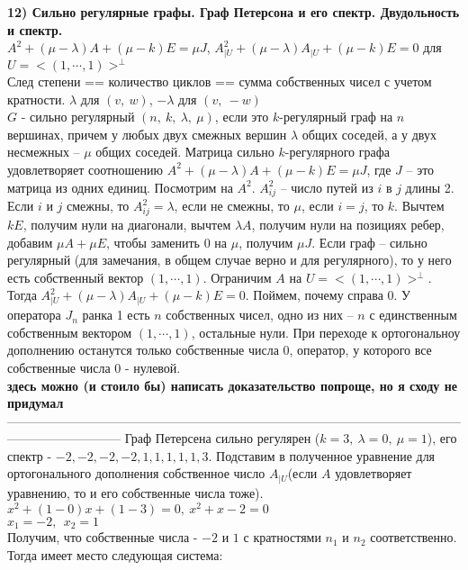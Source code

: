\textbf{12) Сильно регулярные графы. Граф Петерсона и его спектр. Двудольность и спектр.}\\
	
	$A^2+(\mu-\lambda)A + (\mu-k)E=\mu J$, $A_{|U}^2 + (\mu-\lambda)A_{|U} + (\mu-k)E = 0$ для $U = <(1,\cdots,1)>^{\bot}$\\
	След степени == количество циклов == сумма собственных чисел с учетом кратности. $\lambda$ для $(v,\:w)$, $-\lambda$ для $(v,\:-w)$\\
	
	
$G$ - сильно регулярный $(n,~k,~\lambda,~\mu)$, если это $k$-регулярный граф на $n$ вершинах, причем у любых двух смежных вершин $\lambda$ общих соседей, а у двух несмежных -- $\mu$ общих соседей.
\thrm Матрица сильно $k$-регулярного графа удовлетворяет соотношению $A^2+(\mu-\lambda)A + (\mu-k)E=\mu J$, где $J$ -- это матрица из одних единиц.
\ethrm
\proof Посмотрим на $A^2$. $A^2_{ij}$ -- число путей из $i$ в $j$ длины 2. Если $i$ и $j$ смежны, то $A^2_{ij} = \lambda$, если не смежны, то $\mu$, если $i = j$, то $k$. Вычтем $kE$, получим нули на диагонали, вычтем $\lambda A$, получим нули на позициях ребер, добавим $\mu A + \mu E$, чтобы заменить 0 на $\mu$, получим $\mu J$.
\endproof
\rm Если граф -- сильно регулярный (для замечания, в общем случае верно и для регулярного), то у него есть собственный вектор $(1,\cdots,1)$. Ограничим $A$ на $U = <(1,\cdots,1)>^{\bot}$.
Тогда $A_{|U}^2 + (\mu-\lambda)A_{|U} + (\mu-k)E = 0$. Поймем, почему справа 0. У оператора $J_n$ ранка 1 есть $n$ собственных чисел, одно из них -- $n$ с единственным собственным вектором $(1,\cdots,1)$, остальные нули. При переходе к ортогональноу дополнению останутся только собственные числа 0, оператор, у которого все собственные числа 0 - нулевой.\\ 
\textbf{ здесь можно (и стоило бы) написать доказательство попроще, но я сходу не придумал}
\erm
---------------------------------------------------------------------------------------------------------------------------------------
\crl Граф Петерсена сильно регулярен ($k = 3,~\lambda=0,~\mu=1$), его спектр - ${-2,-2,-2,-2,1,1,1,1,1,3}$.
\ecrl
\proof
Подставим в полученное уравнение для ортогонального дополнения собственное число $A_{|U}$(если $A$ удовлетворяет уравнению, то и его собственные числа тоже). \\
$x^2+(1-0)x+(1-3)=0,~x^2+x-2=0$\\
$x_1 = -2,~~x_2 = 1$\\
Получим, что собственные числа - $-2$ и $1$ с кратностями $n_1$ и $n_2$ соответственно. Тогда имеет место следующая система:
